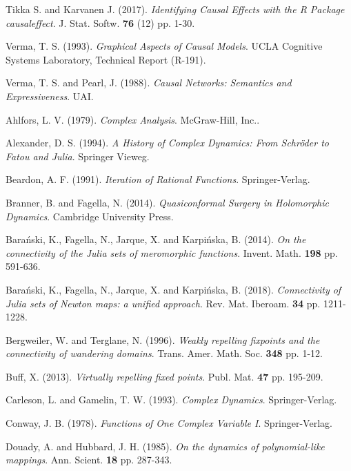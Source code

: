 \begin{thebibliography}{TIOBE 2021}
 {\sc Tikka S. and Karvanen J.} (2017). {\em Identifying Causal Effects with the R Package causaleffect}. J. Stat. Softw. {\bf 76} (12) pp. 1-30.

 {\sc Verma, T. S.} (1993). {\em Graphical Aspects of Causal Models}. UCLA Cognitive Systems Laboratory, Technical Report (R-191).

 {\sc Verma, T. S. and Pearl, J.} (1988). {\em Causal Networks: Semantics and Expressiveness}. UAI.

\end{thebibliography}

\iffalse
{} {\sc Ahlfors, L. V.} (1979). {\em Complex Analysis}. McGraw-Hill, Inc..

 {\sc Alexander, D. S.} (1994). {\em A History of Complex Dynamics: From Schröder to Fatou and Julia}. Springer Vieweg.

 {\sc Beardon, A. F.} (1991). {\em Iteration of Rational Functions}. Springer-Verlag.

 {\sc Branner, B. and Fagella, N.} (2014). {\em Quasiconformal Surgery in Holomorphic Dynamics}. Cambridge University Press.

 {\sc Bara\'nski, K., Fagella, N., Jarque, X. and Karpi\'nska, B.} (2014). {\em On the connectivity of the Julia sets of meromorphic functions}. Invent. Math. {\bf 198} pp. 591-636.

 {\sc Bara\'nski, K., Fagella, N., Jarque, X. and Karpi\'nska, B.} (2018). {\em Connectivity of Julia sets of Newton maps: a unified approach}. Rev. Mat. Iberoam. {\bf 34} pp. 1211-1228.

 {\sc Bergweiler, W. and Terglane, N.} (1996). {\em Weakly repelling fixpoints and the connectivity of wandering domains}. Trans. Amer. Math. Soc. {\bf 348} pp. 1-12.

 {\sc Buff, X.} (2013). {\em Virtually repelling fixed points}. Publ. Mat. {\bf 47} pp. 195-209.

 {\sc Carleson, L. and Gamelin, T. W.} (1993). {\em Complex Dynamics}. Springer-Verlag.

 {\sc Conway, J. B.} (1978). {\em Functions of One Complex Variable I}. Springer-Verlag.

 {\sc Douady, A. and Hubbard, J. H.} (1985). {\em On the dynamics of polynomial-like mappings}. Ann. Scient. {\bf 18} pp. 287-343.

